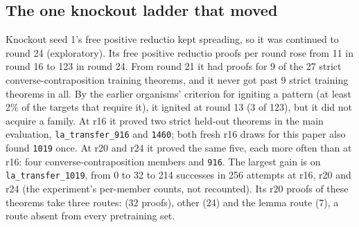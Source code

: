 \subsection{The one knockout ladder that moved}
\label{sec:ko-s1}

Knockout seed 1's free positive reductio kept spreading, so it was continued to round 24 (exploratory). Its free positive
reductio proofs per round rose from 11 in round 16 to 123 in round 24. From round 21 it had proofs for 9 of the 27
strict converse-contraposition training theorems, and it never got past 9 strict training theorems in all. By the
earlier organisms' criterion for igniting a pattern (at least 2\% of the targets that require it), it ignited at round 13
(3 of 123), but it did not acquire a family. At r16 it proved two strict held-out theorems in the main evaluation,
\texttt{la\_transfer\_916} and \texttt{1460}; both fresh r16 draws for this paper also found \texttt{1019} once. At r20
and r24 it proved the same five, each more often than at r16: four converse-contraposition
members and \texttt{916}. The largest gain is on \texttt{la\_transfer\_1019}, from 0 to 32 to 214 successes in 256
attempts at r16, r20 and r24 (the experiment's per-member counts, not recounted). Its r20 proofs of these
theorems take three routes: \sig{} (32 proofs), other \sigp{} (24) and the lemma route (7), a route absent from every
pretraining set.

